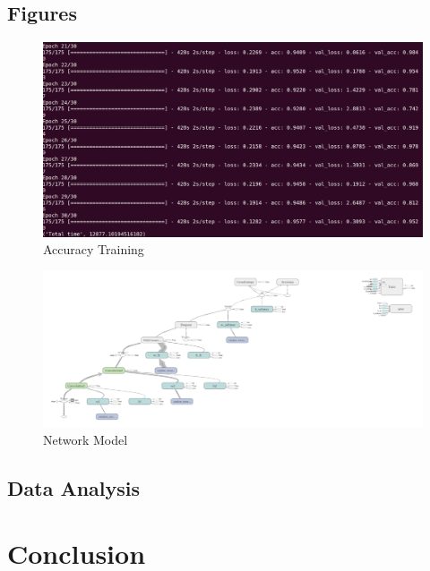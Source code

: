 \documentclass[journal]{IEEEtran}
\begin{document}
	\subsection{Figures}
		\begin{figure}[H]
			\begin{center}
				\includegraphics[width=\linewidth]{pictures/results.png}
				\caption{Accuracy Training}
			\end{center}
		\end{figure}
		\begin{figure}[H]
			\begin{center}
				\includegraphics[width=\linewidth]{pictures/model.png}
				\caption{Network Model}
			\end{center}
		\end{figure}
	
	\subsection{Data Analysis}

\section{Conclusion}

\appendix
\newpage
%
%
\end{document}
